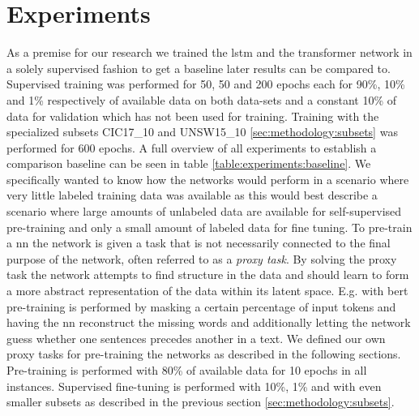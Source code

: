 \chapter{Experiments}\label{sec:experiments}


As a premise for our research we trained the \gls{lstm} and the transformer network in a solely supervised fashion to get a baseline later results can be compared to. Supervised training was performed for 50, 50 and 200 epochs each for 90\%, 10\% and 1\% respectively of available data on both data-sets and a constant 10\% of data for validation which has not been used for training. Training with the specialized subsets CIC17\_10 and UNSW15\_10 \ref{sec:methodology:subsets} was performed for 600 epochs. A full overview of all experiments to establish a comparison baseline can be seen in table \ref{table:experiments:baseline}. We specifically wanted to know how the networks would perform in a scenario where very little labeled training data was available as this would best describe a scenario where large amounts of unlabeled data are available for self-supervised pre-training and only a small amount of labeled data for fine tuning. To pre-train a \gls{nn} the network is given a task that is not necessarily connected to the final purpose of the network, often referred to as a \textit{proxy task}. By solving the proxy task the network attempts to find structure in the data and should learn to form a more abstract representation of the data within its latent space. E.g. with \gls{bert} pre-training is performed by masking a certain percentage of input tokens and having the \gls{nn} reconstruct the missing words and additionally letting the network guess whether one sentences precedes another in a text. We defined our own proxy tasks for pre-training the networks as described in the following sections. Pre-training is performed with 80\% of available data for 10 epochs in all instances. Supervised fine-tuning is performed with 10\%, 1\% and with even smaller subsets as described in the previous section \ref{sec:methodology:subsets}. \par
